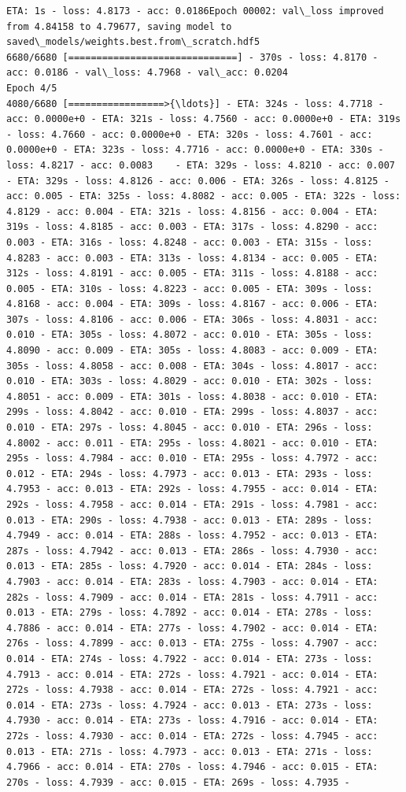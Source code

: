 \documentclass[11pt]{article}
\begin{document}
\begin{Verbatim}[commandchars=\\\{\}]
ETA: 1s - loss: 4.8173 - acc: 0.0186Epoch 00002: val\_loss improved from 4.84158 to 4.79677, saving model to saved\_models/weights.best.from\_scratch.hdf5
6680/6680 [==============================] - 370s - loss: 4.8170 - acc: 0.0186 - val\_loss: 4.7968 - val\_acc: 0.0204
Epoch 4/5
4080/6680 [=================>{\ldots}] - ETA: 324s - loss: 4.7718 - acc: 0.0000e+0 - ETA: 321s - loss: 4.7560 - acc: 0.0000e+0 - ETA: 319s - loss: 4.7660 - acc: 0.0000e+0 - ETA: 320s - loss: 4.7601 - acc: 0.0000e+0 - ETA: 323s - loss: 4.7716 - acc: 0.0000e+0 - ETA: 330s - loss: 4.8217 - acc: 0.0083    - ETA: 329s - loss: 4.8210 - acc: 0.007 - ETA: 329s - loss: 4.8126 - acc: 0.006 - ETA: 326s - loss: 4.8125 - acc: 0.005 - ETA: 325s - loss: 4.8082 - acc: 0.005 - ETA: 322s - loss: 4.8129 - acc: 0.004 - ETA: 321s - loss: 4.8156 - acc: 0.004 - ETA: 319s - loss: 4.8185 - acc: 0.003 - ETA: 317s - loss: 4.8290 - acc: 0.003 - ETA: 316s - loss: 4.8248 - acc: 0.003 - ETA: 315s - loss: 4.8283 - acc: 0.003 - ETA: 313s - loss: 4.8134 - acc: 0.005 - ETA: 312s - loss: 4.8191 - acc: 0.005 - ETA: 311s - loss: 4.8188 - acc: 0.005 - ETA: 310s - loss: 4.8223 - acc: 0.005 - ETA: 309s - loss: 4.8168 - acc: 0.004 - ETA: 309s - loss: 4.8167 - acc: 0.006 - ETA: 307s - loss: 4.8106 - acc: 0.006 - ETA: 306s - loss: 4.8031 - acc: 0.010 - ETA: 305s - loss: 4.8072 - acc: 0.010 - ETA: 305s - loss: 4.8090 - acc: 0.009 - ETA: 305s - loss: 4.8083 - acc: 0.009 - ETA: 305s - loss: 4.8058 - acc: 0.008 - ETA: 304s - loss: 4.8017 - acc: 0.010 - ETA: 303s - loss: 4.8029 - acc: 0.010 - ETA: 302s - loss: 4.8051 - acc: 0.009 - ETA: 301s - loss: 4.8038 - acc: 0.010 - ETA: 299s - loss: 4.8042 - acc: 0.010 - ETA: 299s - loss: 4.8037 - acc: 0.010 - ETA: 297s - loss: 4.8045 - acc: 0.010 - ETA: 296s - loss: 4.8002 - acc: 0.011 - ETA: 295s - loss: 4.8021 - acc: 0.010 - ETA: 295s - loss: 4.7984 - acc: 0.010 - ETA: 295s - loss: 4.7972 - acc: 0.012 - ETA: 294s - loss: 4.7973 - acc: 0.013 - ETA: 293s - loss: 4.7953 - acc: 0.013 - ETA: 292s - loss: 4.7955 - acc: 0.014 - ETA: 292s - loss: 4.7958 - acc: 0.014 - ETA: 291s - loss: 4.7981 - acc: 0.013 - ETA: 290s - loss: 4.7938 - acc: 0.013 - ETA: 289s - loss: 4.7949 - acc: 0.014 - ETA: 288s - loss: 4.7952 - acc: 0.013 - ETA: 287s - loss: 4.7942 - acc: 0.013 - ETA: 286s - loss: 4.7930 - acc: 0.013 - ETA: 285s - loss: 4.7920 - acc: 0.014 - ETA: 284s - loss: 4.7903 - acc: 0.014 - ETA: 283s - loss: 4.7903 - acc: 0.014 - ETA: 282s - loss: 4.7909 - acc: 0.014 - ETA: 281s - loss: 4.7911 - acc: 0.013 - ETA: 279s - loss: 4.7892 - acc: 0.014 - ETA: 278s - loss: 4.7886 - acc: 0.014 - ETA: 277s - loss: 4.7902 - acc: 0.014 - ETA: 276s - loss: 4.7899 - acc: 0.013 - ETA: 275s - loss: 4.7907 - acc: 0.014 - ETA: 274s - loss: 4.7922 - acc: 0.014 - ETA: 273s - loss: 4.7913 - acc: 0.014 - ETA: 272s - loss: 4.7921 - acc: 0.014 - ETA: 272s - loss: 4.7938 - acc: 0.014 - ETA: 272s - loss: 4.7921 - acc: 0.014 - ETA: 273s - loss: 4.7924 - acc: 0.013 - ETA: 273s - loss: 4.7930 - acc: 0.014 - ETA: 273s - loss: 4.7916 - acc: 0.014 - ETA: 272s - loss: 4.7930 - acc: 0.014 - ETA: 272s - loss: 4.7945 - acc: 0.013 - ETA: 271s - loss: 4.7973 - acc: 0.013 - ETA: 271s - loss: 4.7966 - acc: 0.014 - ETA: 270s - loss: 4.7946 - acc: 0.015 - ETA: 270s - loss: 4.7939 - acc: 0.015 - ETA: 269s - loss: 4.7935 - 
\end{Verbatim}
\end{document}

